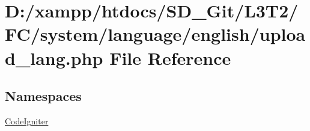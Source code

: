 \hypertarget{system_2language_2english_2upload__lang_8php}{}\section{D\+:/xampp/htdocs/\+S\+D\+\_\+\+Git/\+L3\+T2/\+F\+C/system/language/english/upload\+\_\+lang.php File Reference}
\label{system_2language_2english_2upload__lang_8php}
\subsection*{Namespaces}
\begin{DoxyCompactItemize}
\item 
 \hyperlink{namespace_code_igniter}{Code\+Igniter}
\end{DoxyCompactItemize}
